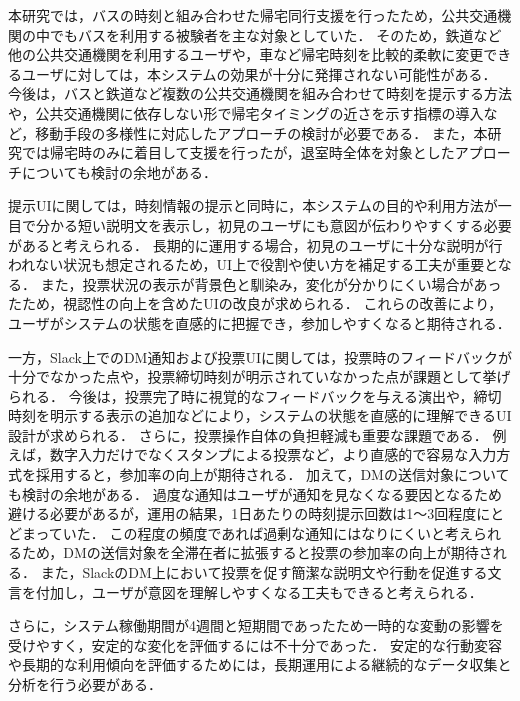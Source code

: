 本研究では，バスの時刻と組み合わせた帰宅同行支援を行ったため，公共交通機関の中でもバスを利用する被験者を主な対象としていた．
そのため，鉄道など他の公共交通機関を利用するユーザや，車など帰宅時刻を比較的柔軟に変更できるユーザに対しては，本システムの効果が十分に発揮されない可能性がある．
今後は，バスと鉄道など複数の公共交通機関を組み合わせて時刻を提示する方法や，公共交通機関に依存しない形で帰宅タイミングの近さを示す指標の導入など，移動手段の多様性に対応したアプローチの検討が必要である．
また，本研究では帰宅時のみに着目して支援を行ったが，退室時全体を対象としたアプローチについても検討の余地がある．





提示UIに関しては，時刻情報の提示と同時に，本システムの目的や利用方法が一目で分かる短い説明文を表示し，初見のユーザにも意図が伝わりやすくする必要があると考えられる．
長期的に運用する場合，初見のユーザに十分な説明が行われない状況も想定されるため，UI上で役割や使い方を補足する工夫が重要となる．
また，投票状況の表示が背景色と馴染み，変化が分かりにくい場合があったため，視認性の向上を含めたUIの改良が求められる．
これらの改善により，ユーザがシステムの状態を直感的に把握でき，参加しやすくなると期待される．


一方，Slack上でのDM通知および投票UIに関しては，投票時のフィードバックが十分でなかった点や，投票締切時刻が明示されていなかった点が課題として挙げられる．
今後は，投票完了時に視覚的なフィードバックを与える演出や，締切時刻を明示する表示の追加などにより，システムの状態を直感的に理解できるUI設計が求められる．
さらに，投票操作自体の負担軽減も重要な課題である．
例えば，数字入力だけでなくスタンプによる投票など，より直感的で容易な入力方式を採用すると，参加率の向上が期待される．
加えて，DMの送信対象についても検討の余地がある．
過度な通知はユーザが通知を見なくなる要因となるため避ける必要があるが，運用の結果，1日あたりの時刻提示回数は1〜3回程度にとどまっていた．
この程度の頻度であれば過剰な通知にはなりにくいと考えられるため，DMの送信対象を全滞在者に拡張すると投票の参加率の向上が期待される．
また，SlackのDM上において投票を促す簡潔な説明文や行動を促進する文言を付加し，ユーザが意図を理解しやすくなる工夫もできると考えられる．


さらに，システム稼働期間が4週間と短期間であったため一時的な変動の影響を受けやすく，安定的な変化を評価するには不十分であった．
安定的な行動変容や長期的な利用傾向を評価するためには，長期運用による継続的なデータ収集と分析を行う必要がある．

